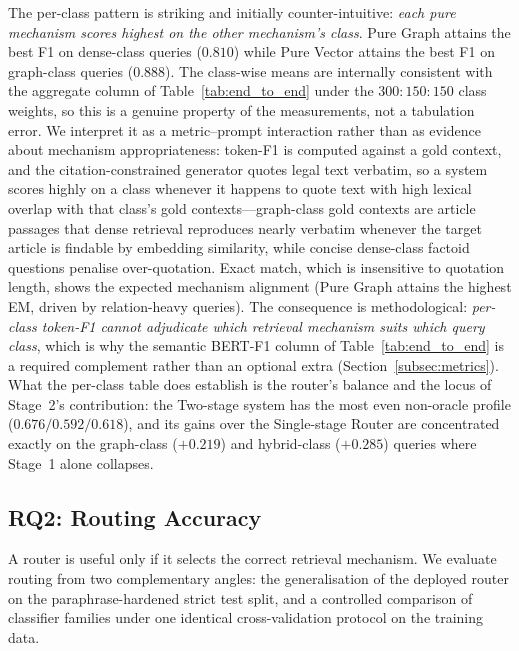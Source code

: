 The per-class pattern is striking and initially counter-intuitive:
\emph{each pure mechanism scores highest on the other mechanism's class}.
Pure Graph attains the best F1 on dense-class queries ($0.810$) while Pure
Vector attains the best F1 on graph-class queries ($0.888$). The class-wise
means are internally consistent with the aggregate column of
Table~\ref{tab:end_to_end} under the $300{:}150{:}150$ class weights, so
this is a genuine property of the measurements, not a tabulation error. We
interpret it as a metric--prompt interaction rather than as evidence about
mechanism appropriateness: token-F1 is computed against a gold context, and
the citation-constrained generator quotes legal text verbatim, so a system
scores highly on a class whenever it happens to quote text with high lexical
overlap with that class's gold contexts---graph-class gold contexts are
article passages that dense retrieval reproduces nearly verbatim whenever the
target article is findable by embedding similarity, while concise dense-class
factoid questions penalise over-quotation. Exact match, which is insensitive
to quotation length, shows the expected mechanism alignment (Pure Graph
attains the highest EM, driven by relation-heavy queries). The consequence is
methodological: \emph{per-class token-F1 cannot adjudicate which retrieval
mechanism suits which query class}, which is why the semantic BERT-F1 column
of Table~\ref{tab:end_to_end} is a required complement rather than an
optional extra (Section~\ref{subsec:metrics}). What the per-class table does
establish is the router's balance and the locus of Stage~2's contribution:
the Two-stage system has the most even non-oracle profile
($0.676/0.592/0.618$), and its gains over the Single-stage Router are
concentrated exactly on the graph-class ($+0.219$) and hybrid-class
($+0.285$) queries where Stage~1 alone collapses.

\subsection{RQ2: Routing Accuracy}\label{subsec:rq2}

A router is useful only if it selects the correct retrieval mechanism. We
evaluate routing from two complementary angles: the generalisation of the
deployed router on the paraphrase-hardened strict test split, and a
controlled comparison of classifier families under one identical
cross-validation protocol on the training data.

